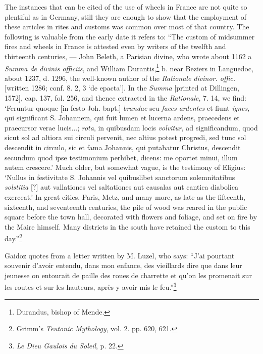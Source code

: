 \documentclass[a4paper, 11pt, oneside, polutonikogreek, english]{article}
\begin{document}
The instances that can be cited of the use of wheels in France are not quite so plentiful as in Germany, still they are enough to show that the employment of these articles in rites and customs was common over most of that country. The following is valuable from the early date it refers to: ``The custom of midsummer fires and wheels in France is attested even by writers of the twelfth and thirteenth centuries, --- John Beleth, a Parisian divine, who wrote about 1162 a \emph{Summa de divinis officiis}, and William Durantis,\footnote{Durandus, bishop of Mende.} b. near Beziers in Languedoc, about 1237, d. 1296, the well-known author of the \emph{Rationale divinor. offic.} [written 1286; conf. 8. 2, 3 `de epacta']. In the \emph{Summa} [printed at Dillingen, 1572], cap. 137, fol. 256, and thence extracted in the \emph{Rationale}, 7. 14, we find: `Feruntur quoque [in festo Joh. bapt.] \emph{brandae} seu \emph{faces ardentes} et fiunt \emph{ignes}, qui significant S. Johannem, qui fuit lumen et lucerna ardens, praecedens et praecursor verae lucis...; \emph{rota}, in quibusdam locis \emph{volvitur}, ad significandum, quod sicut sol ad altiora sui circuli pervenit, nec altius potest progredi, sed tunc sol descendit in circulo, sic et fama Johannis, qui putabatur Christus, descendit secundum quod ipse testimonium perhibet, dicens: me oportet minui, illum autem crescere.' Much older, but somewhat vague, is the testimony of Eligius: `Nullus in festivitate S. Johannis vel quibuslibet sanctorum solemnitatibus \emph{solstitia} [?] aut vallationes vel saltationes aut causalas aut cantica diabolica exerceat.' In great cities, Paris, Metz, and many more, as late as the fifteenth, sixteenth, and seventeenth centuries, the pile of wood was reared in the public square before the town hall, decorated with flowers and foliage, and set on fire by the Maire himself. Many districts in the south have retained the custom to this day.''\footnote{Grimm's \emph{Teutonic Mythology}, vol. 2. pp. 620, 621.}

Gaidoz quotes from a letter written by M. Luzel, who says: ``J'ai pourtant souvenir d'avoir entendu, dans mon enfance, des vieillards dire que dans leur jeunesse on entourait de paille des roues de charrette et qu'on les promenait sur les routes et sur les hauteurs, après y avoir mis le feu.''\footnote{\emph{Le Dieu Gaulois du Soleil}, p. 22.}
\end{document}
